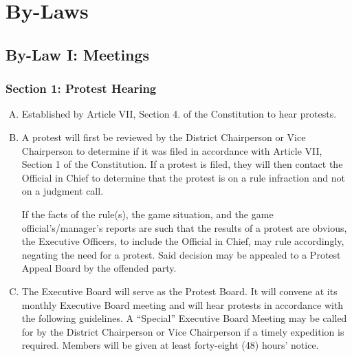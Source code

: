 \chapter{By-Laws}
\label{chap:bylaw}
\section{By-Law I: Meetings}
\subsection{Section 1: Protest Hearing}
\begin{enumerate}[A.]
    \item Established by Article VII, Section 4. of the Constitution to hear protests.
    \item A protest will first be reviewed by the District Chairperson or Vice Chairperson to determine if it was filed in accordance with Article VII, Section 1 of the Constitution.  If a protest is filed, they will then contact the Official in Chief to determine that the protest is on a rule infraction and not on a judgment call.
    
    If the facts of the rule(s), the game situation, and the game official’s/manager’s reports are such that the results of a protest are obvious, the Executive Officers, to include the Official in Chief, may rule accordingly, negating the need for a protest.  Said decision may be appealed to a Protest Appeal Board by the offended party.
    \item The Executive Board will serve as the Protest Board. It will convene at its monthly Executive Board meeting and will hear protests in accordance with the following guidelines. A “Special” Executive Board Meeting may be called for by the District Chairperson or Vice Chairperson if a timely expedition is required. Members will be given at least forty-eight (48) hours’ notice.
\end{enumerate}

